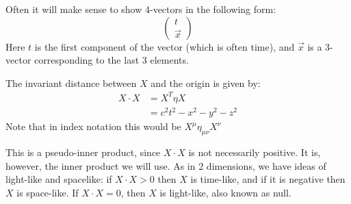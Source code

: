 \documentclass[../Main.tex]{subfiles}
\begin{document}
Often it will make sense to show 4-vectors in the following form:
\begin{equation*}
    \begin{pmatrix}t \\ \vec{x}\end{pmatrix}
\end{equation*}
Here $t$ is the first component of the vector (which is often time), and $\vec{x}$ is a 3-vector corresponding to the last 3 elements.

The invariant distance between $X$ and the origin is given by:
\begin{align*}
    X \cdot X &= X^T \eta X \\
    &= c^2 t^2 - x^2 - y^2 - z^2
\end{align*}
Note that in index notation this would be $X^\mu \eta_{\mu \nu} X^\nu$

This is a pseudo-inner product, since $X \cdot X$ is not necessarily positive. It is, however, the inner product we will use.
As in 2 dimensions, we have ideas of light-like and spacelike: if $X \cdot X > 0$ then $X$ is time-like, and if it is negative then $X$ is space-like. If $X \cdot X = 0$, then $X$ is light-like, also known as null.
\end{document}

